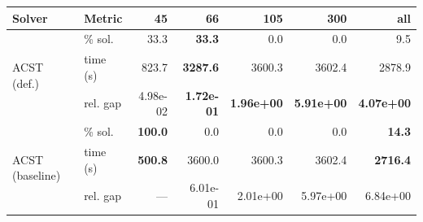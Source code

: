 \begin{tabular}{llrrrrr}
\toprule
 Solver & Metric & 45 & 66 & 105 & 300 & all \\
\midrule
\multirow{3}{*}{ACST (def.)} & \% sol. & 33.3 & \textbf{33.3} & 0.0 & 0.0 & 9.5 \\
  & time (s) & 823.7 & \textbf{3287.6} & 3600.3 & 3602.4 & 2878.9 \\
  & rel. gap & 4.98e-02 & \textbf{1.72e-01} & \textbf{1.96e+00} & \textbf{5.91e+00} & \textbf{4.07e+00} \\
\midrule
\multirow{3}{*}{ACST (baseline)} & \% sol. & \textbf{100.0} & 0.0 & 0.0 & 0.0 & \textbf{14.3} \\
  & time (s) & \textbf{500.8} & 3600.0 & 3600.3 & 3602.4 & \textbf{2716.4} \\
  & rel. gap & --- & 6.01e-01 & 2.01e+00 & 5.97e+00 & 6.84e+00 \\
\bottomrule
\end{tabular}
